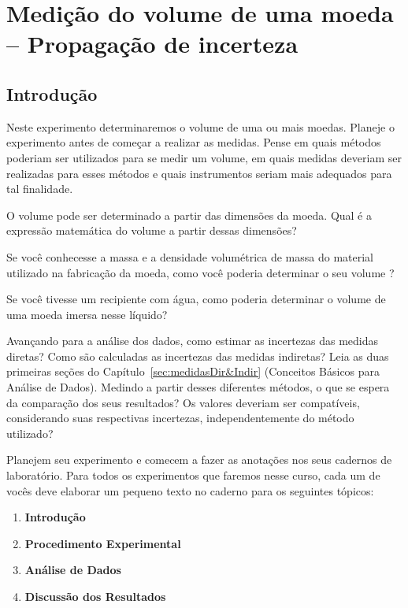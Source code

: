 
\chapter{Medição do volume de uma  moeda -- Propagação de incerteza}
\label{chap:volume}
\vspace{-0.7cm}

\section{Introdução}

Neste experimento determinaremos o volume de uma ou mais moedas.
Planeje o experimento antes de começar a realizar as medidas. Pense em quais métodos poderiam ser utilizados para se medir um volume, em quais medidas deveriam ser realizadas para esses m\'etodos e quais instrumentos seriam mais adequados para tal finalidade.


O volume pode ser determinado a partir das dimensões da moeda. Qual é a  expressão matemática do volume a partir dessas dimensões?

Se voc\^e conhecesse a massa e a densidade volumétrica de massa do material utilizado na fabricação da moeda, como você poderia determinar o seu volume ?

Se voc\^e tivesse  um recipiente com  água, como poderia determinar o volume de uma moeda imersa nesse líquido?

Avançando para a análise dos dados, como  estimar as incertezas das medidas diretas? Como são calculadas as incertezas das medidas indiretas?  Leia  as duas primeiras  seções do Capítulo~\ref{sec:medidasDir&Indir} (Conceitos Básicos para Análise de Dados).
Medindo a partir desses diferentes métodos, o que se espera da comparação dos seus  resultados?  Os valores deveriam ser compatíveis, considerando suas respectivas incertezas, independentemente do método utilizado?

Planejem seu experimento e comecem a fazer as anotações nos seus cadernos de laboratório. Para todos os experimentos que faremos nesse curso, cada um de vocês deve elaborar um pequeno texto no caderno para os seguintes tópicos: 

\begin{enumerate}
\item {\bf Introdução }
\item {\bf Procedimento Experimental}
\item {\bf Análise de Dados}
\item {\bf Discussão dos Resultados}
\end{enumerate}

